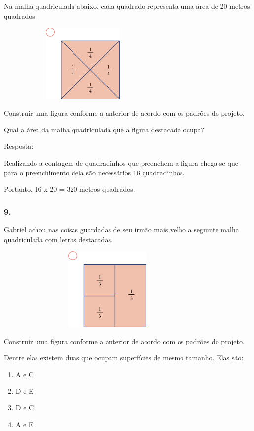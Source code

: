 Na malha quadriculada abaixo, cada quadrado representa uma área de 20
metros quadrados.

\includegraphics[width=3.33333in,height=1.50517in]{media/image68.png}

Construir uma figura conforme a anterior de acordo com os padrões do
projeto.

Qual a área da malha quadriculada que a figura destacada ocupa?

Resposta:

Realizando a contagem de quadradinhos que preenchem a figura chega-se
que para o preenchimento dela são necessários 16 quadradinhos.

Portanto, 16 x 20 = 320 metros quadrados.

\subsubsection{9.}\label{section-60}

Gabriel achou nas coisas guardadas de seu irmão mais velho a seguinte
malha quadriculada com letras destacadas.

\includegraphics[width=4.36538in,height=1.60417in]{media/image69.png}

Construir uma figura conforme a anterior de acordo com os padrões do
projeto.

Dentre elas existem duas que ocupam superfícies de mesmo tamanho. Elas
são:

\begin{enumerate}
\def\labelenumi{\alph{enumi})}
\item
  A e C
\item
  D e E
\item
  D e C
\item
  A e E
\end{enumerate}


